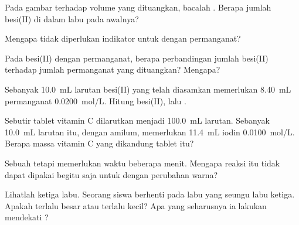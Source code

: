 \begin{exercise}[$\star$]\label{exo:g11:titration:3}
Pada gambar  terhadap volume yang dituangkan, bacalah . Berapa jumlah besi(II) di dalam labu pada awalnya?
\end{exercise}

\begin{exercise}[$\star$]\label{exo:g11:titration:4}
Mengapa tidak diperlukan indikator untuk  dengan permanganat?
\end{exercise}

\begin{exercise}[$\star$]\label{exo:g11:titration:5}
Pada   besi(II) dengan permanganat, berapa
perbandingan jumlah besi(II) terhadap jumlah permanganat yang
dituangkan? Mengapa?
\end{exercise}

\begin{exercise}[$\star\star$]\label{exo:g11:titration:6}
Sebanyak \qty{10.0}{mL} larutan besi(II) yang telah diasamkan memerlukan
\qty{8.40}{mL} permanganat \qty{0.0200}{mol/L}. Hitung  besi(II), lalu .
\end{exercise}

\begin{exercise}[$\star\star$]\label{exo:g11:titration:7}
Sebutir tablet vitamin C dilarutkan menjadi \qty{100.0}{mL} larutan.
Sebanyak \qty{10.0}{mL} larutan itu, dengan amilum, memerlukan
\qty{11.4}{mL} iodin \qty{0.0100}{mol/L}. Berapa massa vitamin C yang
dikandung tablet itu?
\end{exercise}

\begin{exercise}[$\star\star$]\label{exo:g11:titration:8}
Sebuah  tetapi memerlukan waktu beberapa menit. Mengapa
reaksi itu tidak dapat dipakai begitu saja untuk  dengan
perubahan warna?
\end{exercise}

\begin{exercise}[$\star\star$]\label{exo:g11:titration:9}
Lihatlah ketiga labu. Seorang siswa berhenti pada labu yang seungu labu
ketiga. Apakah  terlalu besar atau terlalu kecil? Apa
yang seharusnya ia lakukan mendekati ?
\end{exercise}

